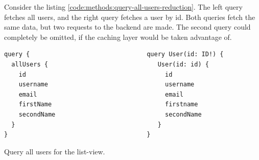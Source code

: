 Consider the listing \ref{code:methods:query-all-users-reduction}. The left query fetches all users, and the right query fetches a user by id. Both queries fetch the same data, but two requests to the backend are made. The second query could completely be omitted, if the caching layer would be taken advantage of.


\ifshowListings
\begin{listing}[H]
\begin{verbatim}
query {                                query User(id: ID!) {
  allUsers {                              User(id: id) {
    id                                      id
    username                                username
    email                                   email
    firstName                               firstname
    secondName                              secondName
  }                                       }    
}                                      }
\end{verbatim}
\caption{Query all users for the list-view.}\label{code:methods:query-all-users-reduction}
\end{listing}
\fi

\ifshowUnusedContent


